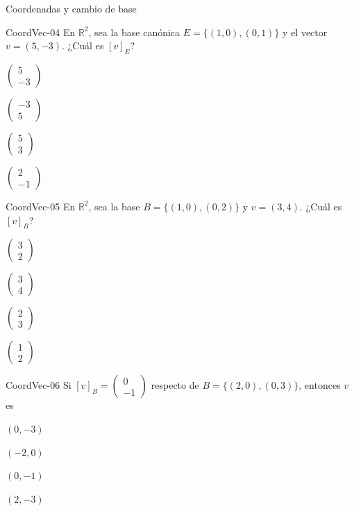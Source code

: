 \documentclass[a4,11pt]{aleph-notas}
\begin{document}
\begin{quiz}{Coordenadas y cambio de base}
\begin{multi}[]%
    {CoordVec-04}
    En \(\mathbb{R}^2\), sea la base canónica \(E=\{(1,0),(0,1)\}\) y el vector \(v=(5,-3)\). ¿Cuál es \([v]_E\)?
    \item* $\begin{pmatrix}5\\-3\end{pmatrix}$
    \item $\begin{pmatrix}-3\\5\end{pmatrix}$
    \item $\begin{pmatrix}5\\3\end{pmatrix}$
    \item $\begin{pmatrix}2\\-1\end{pmatrix}$
\end{multi}

\begin{multi}[]%
    {CoordVec-05}
    En \(\mathbb{R}^2\), sea la base \(B=\{(1,0),(0,2)\}\) y \(v=(3,4)\). ¿Cuál es \([v]_B\)?
    \item* $\begin{pmatrix}3\\2\end{pmatrix}$
    \item $\begin{pmatrix}3\\4\end{pmatrix}$
    \item $\begin{pmatrix}2\\3\end{pmatrix}$
    \item $\begin{pmatrix}1\\2\end{pmatrix}$
\end{multi}

\begin{multi}[]%
    {CoordVec-06}
    Si \([v]_B=\begin{pmatrix}0\\-1\end{pmatrix}\) respecto de \(B=\{(2,0),(0,3)\}\), entonces \(v\) es
    \item* \((0,-3)\)
    \item \((-2,0)\)
    \item \((0,-1)\)
    \item \((2,-3)\)
\end{multi}


\end{quiz}
\end{document}
